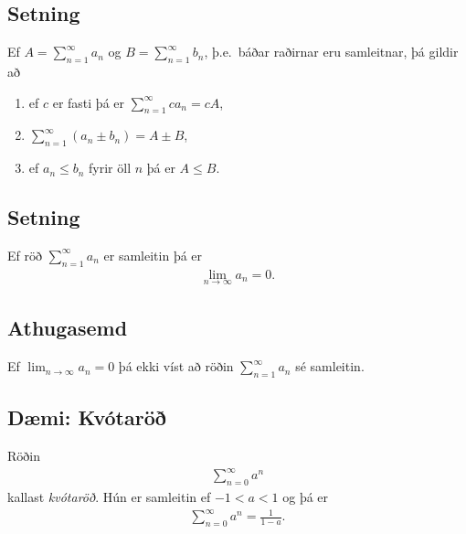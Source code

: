\documentclass[a4paper,10pt,icelandic]{sphinxmanual}
\begin{document}
\subsection{Setning}
\label{kafli09:id7}
Ef \(A=\sum_{n=1}^\infty a_n\) og \(B=\sum_{n=1}^\infty b_n\),
þ.e. báðar raðirnar eru samleitnar, þá gildir að
\begin{enumerate}
\item {} 
ef \(c\) er fasti þá er \(\sum_{n=1}^\infty ca_n=cA\),

\item {} 
\(\sum_{n=1}^\infty (a_n\pm b_n)=A\pm B\),

\item {} 
ef \(a_n\leq b_n\) fyrir öll \(n\) þá er \(A\leq B\).

\end{enumerate}


\subsection{Setning}
\label{kafli09:id8}
Ef röð \(\sum_{n=1}^\infty a_n\) er samleitin þá er
\begin{equation*}
\begin{split}\lim_{n\rightarrow\infty}a_n=0.\end{split}
\end{equation*}

\subsection{Athugasemd}
\label{kafli09:athugasemd}
Ef \(\lim_{n \to \infty} a_n = 0\) þá ekki víst að röðin
\(\sum_{n=1}^\infty a_n\) sé samleitin.


\subsection{Dæmi: Kvótaröð}
\label{kafli09:daemi-kvotaro}\label{kafli09:index-7}
Röðin
\begin{equation*}
\begin{split}\sum_{n=0}^\infty a^n\end{split}
\end{equation*}
kallast \emph{kvótaröð}. Hún er samleitin ef \(-1<a<1\) og þá er
\begin{equation*}
\begin{split}\sum_{n=0}^\infty a^n = \frac{1}{1-a}.\end{split}
\end{equation*}
\end{document}
